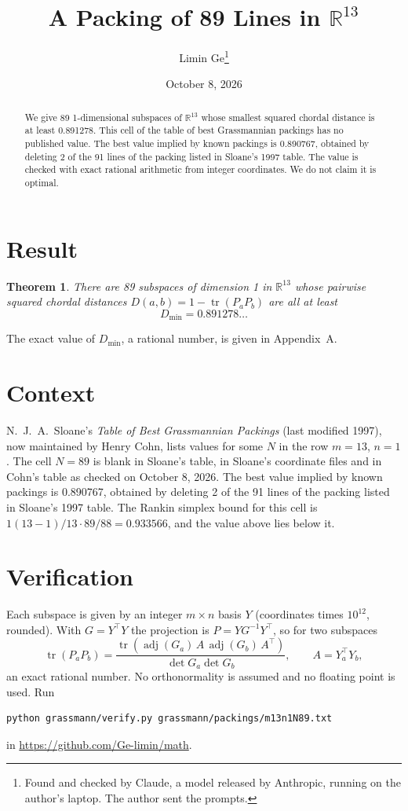 \documentclass[11pt,a4paper]{article}
\title{A Packing of 89 Lines in $\mathbb{R}^{13}$}
\author{Limin Ge\thanks{Found and checked by Claude, a model released by Anthropic, running on the author's laptop. The author sent the prompts.}}
\date{October 8, 2026}
\newtheorem*{theorem}{Theorem}
\begin{document}
\maketitle
\begin{abstract}
We give 89 1-dimensional subspaces of $\mathbb{R}^{13}$ whose smallest squared chordal distance is at least 0.891278. This cell of the table of best Grassmannian packings has no published value. The best value implied by known packings is 0.890767, obtained by deleting 2 of the 91 lines of the packing listed in Sloane's 1997 table. The value is checked with exact rational arithmetic from integer coordinates. We do not claim it is optimal.
\end{abstract}

\section{Result}
\begin{theorem}
There are 89 subspaces of dimension 1 in $\mathbb{R}^{13}$ whose pairwise squared chordal distances $D(a,b) = 1 - \operatorname{tr}(P_aP_b)$ are all at least
\[ D_{\min} = 0.891278\ldots \]
\end{theorem}
The exact value of $D_{\min}$, a rational number, is given in Appendix~A.


\section{Context}
N.~J.~A.~Sloane's \emph{Table of Best Grassmannian Packings} (last modified 1997), now maintained by Henry Cohn, lists values for some $N$ in the row $m=13$, $n=1$. The cell $N=89$ is blank in Sloane's table, in Sloane's coordinate files and in Cohn's table as checked on October 8, 2026. The best value implied by known packings is 0.890767, obtained by deleting 2 of the 91 lines of the packing listed in Sloane's 1997 table. The Rankin simplex bound for this cell is $1(13-1)/13\cdot 89/88 = 0.933566$, and the value above lies below it.


\section{Verification}
Each subspace is given by an integer $m\times n$ basis $Y$ (coordinates times $10^{12}$, rounded). With $G=Y^\top Y$ the projection is $P=YG^{-1}Y^\top$, so for two subspaces
\[ \operatorname{tr}(P_aP_b)=\frac{\operatorname{tr}(\operatorname{adj}(G_a)\,A\,\operatorname{adj}(G_b)\,A^\top)}{\det G_a\det G_b},\qquad A=Y_a^\top Y_b, \]
an exact rational number. No orthonormality is assumed and no floating point is used. Run
\begin{verbatim}
python grassmann/verify.py grassmann/packings/m13n1N89.txt
\end{verbatim}
in \url{https://github.com/Ge-limin/math}.
\end{document}
